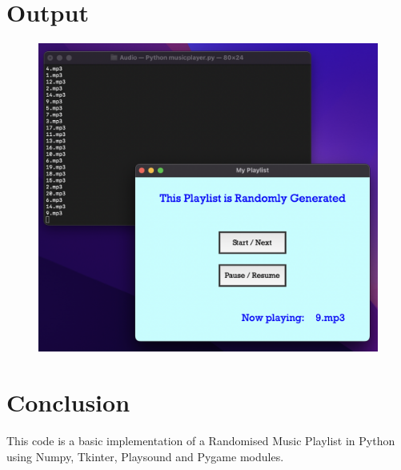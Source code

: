 \documentclass[journal,12pt,twocolumn]{IEEEtran}
\begin{document}
\section{Output}
\begin{figure}[h]
\includegraphics[scale=0.36]{images/Output.png}
\caption {}
\end{figure}

\section{Conclusion}
This code is a basic implementation of a Randomised Music Playlist in Python using Numpy, Tkinter, Playsound and Pygame modules.
\end{document}
